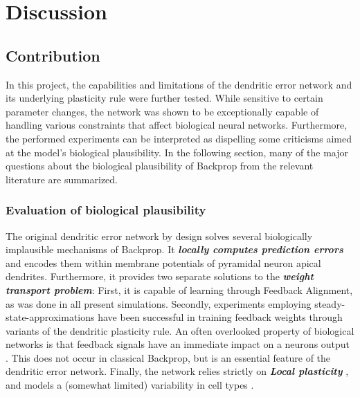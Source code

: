 
\chapter{Discussion}


\section{Contribution}\label{sec-contribution}

In this project, the capabilities and limitations of the dendritic error network and its underlying plasticity rule were
further tested. While sensitive to certain parameter changes, the network was shown to be exceptionally capable of
handling various constraints that affect biological neural networks. Furthermore, the performed experiments can be
interpreted as dispelling some criticisms aimed at the model's biological plausibility. In the following section, 
many of the major questions about the biological plausibility of Backprop from the relevant literature are summarized.


\subsection*{Evaluation of biological plausibility}

The original dendritic error network by design solves several biologically implausible mechanisms of Backprop. It
\textit{\textbf{locally computes prediction errors}} and encodes them within membrane potentials of pyramidal neuron
apical dendrites. Furthermore, it provides two separate solutions to the \textit{\textbf{weight transport problem}}:
First, it is capable of learning through Feedback Alignment, as was done in all present simulations. Secondly,
experiments employing steady-state-approximations have been successful in training feedback weights through variants of
the dendritic plasticity rule. An often overlooked property of biological networks is that feedback signals have an
immediate impact on a neurons output \citep{Larkum2009,Gilbert2013}. This does not occur in classical Backprop, but is
an essential feature of the dendritic error network. Finally, the network relies strictly on \textit{\textbf{Local
plasticity}} \citep{Whittington2017}, and models a (somewhat limited) variability in cell types
\citep{Bartunov2018}.

